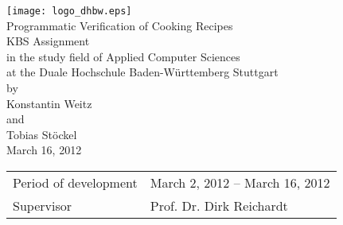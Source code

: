 \begin{titlepage}

  \begin{center}
    \texttt{[image: logo\_dhbw.eps]}\\[3cm]
  
    {\Large Programmatic Verification of Cooking Recipes} \\[1.5cm]
    {\LARGE KBS Assignment} \\[1cm]
    {\large in the study field of Applied Computer Sciences} \\[0.5cm]
    {\large at the Duale Hochschule Baden-Württemberg Stuttgart} \\[1.5cm]
    {\large by} \\[0.5cm]
    {\Large Konstantin Weitz} \\[0.2cm]
    {\large and} \\[0.2cm]
    {\Large Tobias Stöckel} \\[1.75cm]
    {\large March 16, 2012}
    \vfill
    \begin{tabularx}{\textwidth}{ X X }
      Period of development & March 2, 2012 -- March 16, 2012 \\
      Supervisor & Prof. Dr. Dirk Reichardt \\
    \end{tabularx}
  \end{center}

\end{titlepage}